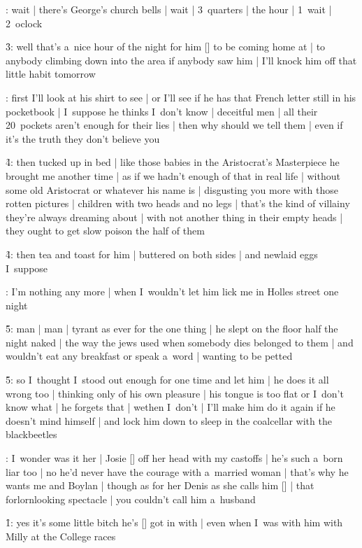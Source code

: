 :
wait |
there's George's church bells |
wait |
3~quarters |
the hour |
1~wait |
2~oclock

\f3:
well that's a~nice hour of the night for him [\bloom] to be coming home at |
to anybody climbing down into the area if anybody saw him |
I'll knock him off that little habit tomorrow

:
first I'll look at his shirt to see |
or I'll see if he has that French letter still in his pocketbook |
I~suppose he thinks I~don't know |
deceitful men |
all their 20~pockets aren't enough for their lies |
then why should we tell them |
even if it's the truth they don't believe you

\f4:
then tucked up in bed |
like those babies in the Aristocrat's Masterpiece he brought me another time |
as if we hadn't enough of that in real life |
without some old Aristocrat or whatever his name is |
disgusting you more with those rotten pictures |
children with two heads and no legs |
that's the kind of villainy they're always dreaming about |
with not another thing in their empty heads |
they ought to get slow poison the half of them

\f4:
then tea and toast for him |
buttered on both sides |
and newlaid eggs I~suppose

:
I'm nothing any more |
when I~wouldn't let him lick me in Holles street one night

\f5:
man |
man |
tyrant as ever for the one thing |
he slept on the floor half the night naked |
the way the jews used when somebody dies belonged to them |
and wouldn't eat any breakfast or speak a~word |
wanting to be petted

\f5:
so I~thought I~stood out enough for one time and let him |
he does it all wrong too |
thinking only of his own pleasure |
his tongue is too flat or I~don't know what |
he forgets that |
wethen I~don't |
I'll make him do it again if he doesn't mind himself |
and lock him down to sleep in the coalcellar with the blackbeetles

:
I~wonder was it her |
Josie [\josie] off her head with my castoffs |
he's such a~born liar too |
no he'd never have the courage with a~married woman |
that's why he wants me and Boylan |
though as for her Denis as she calls him [\breen] |
that forlornlooking spectacle |
you couldn't call him a~husband

\f1:
yes it's some little bitch he's [\bloom] got in with |
even when I~was with him with Milly at the College races

